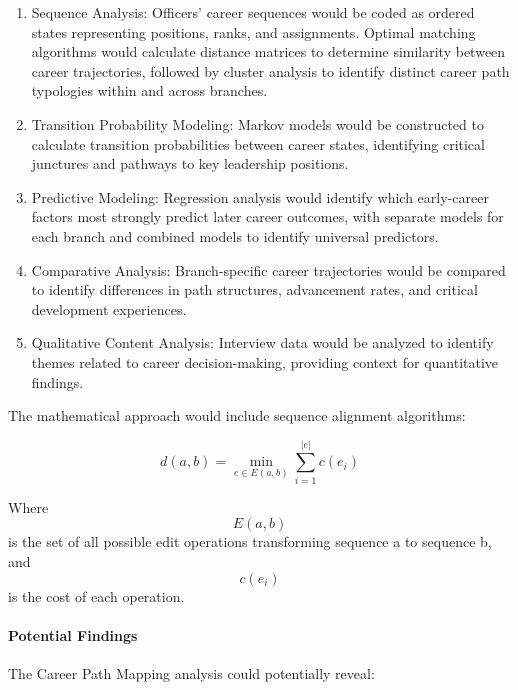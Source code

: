 \documentclass[./main.tex]{subfiles}
\begin{document}
\begin{enumerate}
\def\labelenumi{\arabic{enumi}.}
\item
  Sequence Analysis: Officers' career sequences would be coded as
  ordered states representing positions, ranks, and assignments. Optimal
  matching algorithms would calculate distance matrices to determine
  similarity between career trajectories, followed by cluster analysis
  to identify distinct career path typologies within and across
  branches.
\item
  Transition Probability Modeling: Markov models would be constructed to
  calculate transition probabilities between career states, identifying
  critical junctures and pathways to key leadership positions.
\item
  Predictive Modeling: Regression analysis would identify which
  early-career factors most strongly predict later career outcomes, with
  separate models for each branch and combined models to identify
  universal predictors.
\item
  Comparative Analysis: Branch-specific career trajectories would be
  compared to identify differences in path structures, advancement
  rates, and critical development experiences.
\item
  Qualitative Content Analysis: Interview data would be analyzed to
  identify themes related to career decision-making, providing context
  for quantitative findings.
\end{enumerate}

The mathematical approach would include sequence alignment algorithms:

\[ d(a,b) = \min_{e \in E(a,b)} \sum_{i=1}^{|e|} c(e_i) \]

Where \[E(a,b)\] is the set of all possible edit operations transforming
sequence a to sequence b, and \[c(e_i)\] is the cost of each operation.

\paragraph{Potential Findings}\label{potential-findings}

The Career Path Mapping analysis could potentially reveal:
\end{document}
